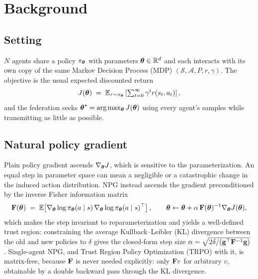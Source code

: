 \section{Background}
\label{sec:background}

\subsection{Setting}

$N$ agents share a policy $\pi_{\boldsymbol{\theta}}$ with parameters $\boldsymbol{\theta} \in \mathbb{R}^d$ and
each interacts with its own copy of the same Markov Decision Process (MDP) $(\mathcal{S}, \mathcal{A},
P, r, \gamma)$. The objective is the usual expected discounted return
\begin{equation}
  J(\boldsymbol{\theta}) \;=\; \mathbb{E}_{\tau \sim \pi_{\boldsymbol{\theta}}}
  \left[\textstyle\sum_{t=0}^{\infty} \gamma^{t} r(s_t, a_t)\right],
\end{equation}
and the federation seeks $\boldsymbol{\theta}^\star = \arg\max_{\boldsymbol{\theta}} J(\boldsymbol{\theta})$ using every
agent's samples while transmitting as little as possible.

\subsection{Natural policy gradient}

Plain policy gradient ascends $\nabla_{\boldsymbol{\theta}} J$, which is sensitive to the
parameterization. An equal step in parameter space can mean a negligible or a
catastrophic change in the induced action distribution. NPG instead ascends
the gradient preconditioned by the inverse Fisher information matrix
\begin{equation}
  \mathbf{F}(\boldsymbol{\theta}) \;=\;
  \mathbb{E}\!\left[\nabla_{\boldsymbol{\theta}} \log \pi_{\boldsymbol{\theta}}(a\mid s)\,
              \nabla_{\boldsymbol{\theta}} \log \pi_{\boldsymbol{\theta}}(a\mid s)^{\top}\right],
  \qquad
  \boldsymbol{\theta} \leftarrow \boldsymbol{\theta} + \alpha\, \mathbf{F}(\boldsymbol{\theta})^{-1} \nabla_{\boldsymbol{\theta}} J(\boldsymbol{\theta}),
\end{equation}
which makes the step invariant to reparameterization and yields a well-defined
trust region: constraining the average Kullback--Leibler (KL) divergence between the old and new
policies to $\delta$ gives the closed-form step size $\alpha = \sqrt{2\delta /
(\mathbf{g}^{\top} \mathbf{F}^{-1} \mathbf{g})}$ \citep{kakade2001npg, schulman2015trpo}.
Single-agent NPG, and Trust Region Policy Optimization (TRPO) with it, is
matrix-free, because $\mathbf{F}$ is never needed
explicitly: only $\mathbf{F} v$ for arbitrary $v$, obtainable by a double backward
pass through the KL divergence.

